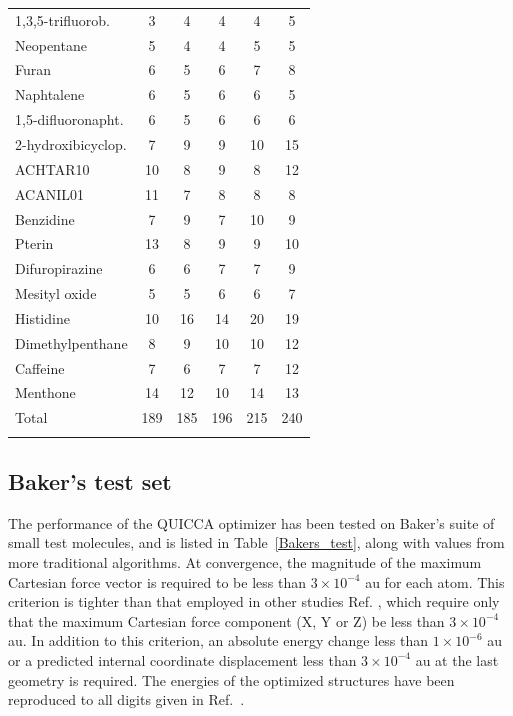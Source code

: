 \documentclass[prl,twocolumn,showpacs,twocolumngrid,superbib]{revtex4}
\begin{document}
\begin{table}[h]
\begin{tabular}{lccccc}
1,3,5-trifluorob.      &   3    &   4    &    4    &    4   &   5     \\
Neopentane             &   5    &   4    &    4    &    5   &   5     \\
Furan                  &   6    &   5    &    6    &    7   &   8     \\
Naphtalene             &   6    &   5    &    6    &    6   &   5     \\
1,5-difluoronapht.     &   6    &   5    &    6    &    6   &   6     \\
2-hydroxibicyclop.     &   7    &   9    &    9    &   10   &  15     \\
ACHTAR10               &  10    &   8    &    9    &    8   &  12     \\
ACANIL01               &  11    &   7    &    8    &    8   &   8     \\
Benzidine              &   7    &   9    &    7    &   10   &   9     \\
Pterin                 &  13    &   8    &    9    &    9   &  10     \\
Difuropirazine         &   6    &   6    &    7    &    7   &   9     \\
Mesityl oxide          &   5    &   5    &    6    &    6   &   7     \\
Histidine              &  10    &  16    &   14    &   20   &  19     \\
Dimethylpenthane       &   8    &   9    &   10    &   10   &  12     \\
Caffeine               &   7    &   6    &    7    &    7   &  12     \\
Menthone               &  14    &  12    &   10    &   14   &  13     \\
\colrule
Total                  & 189    & 185    &  196    &  215   & 240     \\
\botrule
\end{tabular}
\end{table}

\subsection{Baker's test set}

The performance of the QUICCA optimizer has been tested on Baker's suite \cite{bakerstest} of 
small test molecules, and is listed in Table~\ref{Bakers_test}, along with values from more traditional 
algorithms.  At convergence, the magnitude of the maximum Cartesian force vector is required to be less 
than $3\times10^{-4}$ au for each atom.  This criterion is tighter than that employed in other studies 
Ref. \cite{bakerstest}, which require only that the maximum Cartesian force component (X, Y or Z) be less 
than $3\times10^{-4}$ au.  In addition to this criterion,  an absolute energy change less than 
$1\times10^{-6}$ au or a predicted internal coordinate displacement less than $3\times10^{-4}$ au at the last 
geometry is required.  The energies of the optimized structures have been reproduced to all digits given 
in Ref.~\cite{bakerstest}. 
\end{document}
